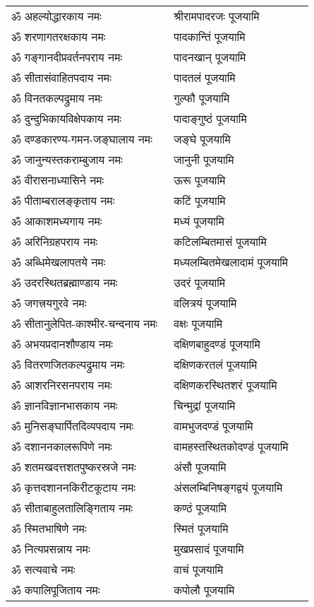 \begin{supertabular}{p{0.525\linewidth}p{0.45\linewidth}}
ॐ अहल्योद्धारकाय नमः & श्रीरामपादरजः पूजयामि \\
ॐ शरणागतरक्षकाय नमः & पादकान्तिं पूजयामि \\
ॐ गङ्गानदीप्रवर्तनपराय नमः & पादनखान् पूजयामि \\
ॐ सीतासंवाहितपदाय नमः & पादतलं पूजयामि \\
ॐ विनतकल्पद्रुमाय नमः & गुल्फौ पूजयामि \\
ॐ दुन्दुभिकायविक्षेपकाय नमः & पादाङ्गुष्ठं पूजयामि \\
ॐ दण्डकारण्य-गमन-जङ्घालाय नमः & जङ्घे पूजयामि \\
ॐ जानुन्यस्तकराम्बुजाय नमः & जानुनी पूजयामि \\
ॐ वीरासनाध्यासिने नमः & ऊरू पूजयामि \\
ॐ पीताम्बरालङ्कृताय नमः & कटिं पूजयामि \\
ॐ आकाशमध्यगाय नमः & मध्यं पूजयामि \\
ॐ अरिनिग्रहपराय नमः & कटिलम्बितमासं पूजयामि \\
ॐ अब्धिमेखलापतये नमः & मध्यलम्बितमेखलादामं पूजयामि \\
ॐ उदरस्थितब्रह्माण्डाय नमः & उदरं पूजयामि \\
ॐ जगत्त्रयगुरवे नमः & वलित्रयं पूजयामि \\
ॐ सीतानुलेपित-काश्मीर-चन्दनाय नमः & वक्षः पूजयामि \\
ॐ अभयप्रदानशौण्डाय नमः & दक्षिणबाहुदण्डं पूजयामि \\
ॐ वितरणजितकल्पद्रुमाय नमः & दक्षिणकरतलं पूजयामि \\
ॐ आशरनिरसनपराय नमः & दक्षिणकरस्थितशरं पूजयामि \\
ॐ ज्ञानविज्ञानभासकाय नमः & चिन्मुद्रां पूजयामि \\
ॐ मुनिसङ्घार्पितदिव्यपदाय नमः & वामभुजदण्डं पूजयामि \\
ॐ दशाननकालरूपिणे नमः & वामहस्तस्थितकोदण्डं पूजयामि \\
ॐ शतमखदत्तशतपुष्करस्रजे नमः & अंसौ पूजयामि \\
ॐ कृत्तदशाननकिरीटकूटाय नमः & अंसलम्बिनिषङ्गद्वयं पूजयामि \\
ॐ सीताबाहुलतालिङ्गिताय नमः & कण्ठं पूजयामि \\
ॐ स्मितभाषिणे नमः & स्मितं पूजयामि \\
ॐ नित्यप्रसन्नाय नमः & मुखप्रसादं पूजयामि \\
ॐ सत्यवाचे नमः & वाचं पूजयामि \\
ॐ कपालिपूजिताय नमः & कपोलौ पूजयामि \\

\end{supertabular}
